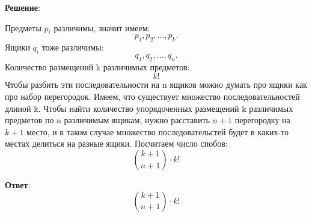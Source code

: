 \documentclass{article}
\begin{document}
\begin{enumerate}
    \textbf{Решение}:

    Предметы $p_i$ различимы, значит имеем:
    \begin{equation}
      p_1, p_2, \ldots, p_k.
    \end{equation}
    Ящики $q_i$ тоже различимы:
    \begin{equation}
      q_1, q_2, \ldots, q_n.
    \end{equation}
    Количество размещений k различимых предметов:
    \begin{equation}
      k!
    \end{equation}
    Чтобы разбить эти последовательности на n ящиков можно думать про ящики как про набор перегородок. Имеем, что существует множество последовательностей длиной k. Чтобы найти количество упорядоченных размещений k различимых предметов по n различимым ящикам, нужно расставить $n + 1$ перегородку на $k + 1$ место, и в таком случае множество последовательстей будет в каких-то местах делиться на разные ящики. Посчитаем число спобов:
    \begin{equation}
      \binom{k + 1}{n + 1} \cdot k!
    \end{equation}

    \textbf{Ответ}:
    $$\binom{k + 1}{n + 1} \cdot k!$$

      
  \end{enumerate}
\end{document}
